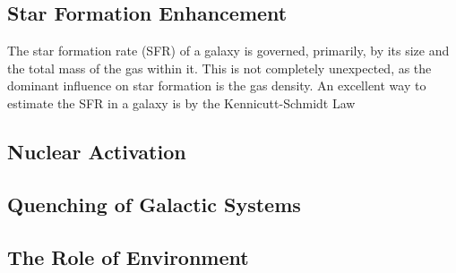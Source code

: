\subsection{Star Formation Enhancement} 
\noindent The star formation rate (SFR) of a galaxy is governed, primarily, by its size and the total mass of the gas within it. This is not completely unexpected, as the dominant influence on star formation is the gas density. An excellent way to estimate the SFR in a galaxy is by the Kennicutt-Schmidt Law \citep{Kennicutt-Schmidt Law Paper}

\subsection{Nuclear Activation}
\subsection{Quenching of Galactic Systems}
\subsection{The Role of Environment}